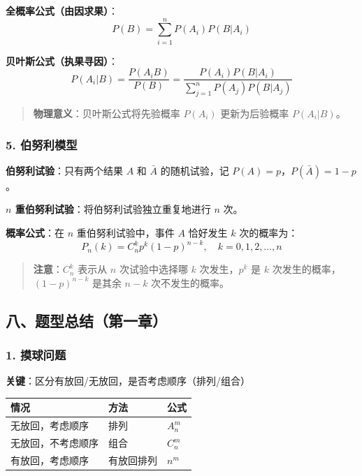 \documentclass[12pt,a4paper]{ctexart}
\newenvironment{myquote}
  {\par\vspace{0.5em}\begin{quote}\sffamily\color{gray}}
  {\end{quote}\vspace{0.5em}}
\begin{document}
\textbf{全概率公式（由因求果）}：
\[
    P(B) = \sum_{i=1}^n P(A_i) P(B|A_i)
\]

\textbf{贝叶斯公式（执果寻因）}：
\[
    P(A_i|B) = \frac{P(A_i B)}{P(B)} = \frac{P(A_i) P(B|A_i)}{\sum_{j=1}^n P(A_j) P(B|A_j)}
\]

\begin{myquote}
    \textbf{物理意义}：贝叶斯公式将先验概率 $P(A_i)$ 更新为后验概率 $P(A_i|B)$。
\end{myquote}

\subsubsection{5. 伯努利模型}
\textbf{伯努利试验}：只有两个结果 $A$ 和 $\bar{A}$ 的随机试验，记 $P(A) = p$，$P(\bar{A}) = 1-p$。

\textbf{$n$ 重伯努利试验}：将伯努利试验独立重复地进行 $n$ 次。

\textbf{概率公式}：在 $n$ 重伯努利试验中，事件 $A$ 恰好发生 $k$ 次的概率为：
\[
    P_n(k) = C_n^k p^k (1-p)^{n-k}, \quad k = 0,1,2,\dots,n
\]

\begin{myquote}
    \textbf{注意}：$C_n^k$ 表示从 $n$ 次试验中选择哪 $k$ 次发生，$p^k$ 是 $k$ 次发生的概率，$(1-p)^{n-k}$ 是其余 $n-k$ 次不发生的概率。
\end{myquote}

\subsection{八、题型总结（第一章）}

\subsubsection{1. 摸球问题}
\textbf{关键}：区分有放回/无放回，是否考虑顺序（排列/组合）

\begin{center}
    \begin{tabular}{@{}lll@{}}
        \toprule
        \textbf{情况} & \textbf{方法} & \textbf{公式} \\
        \midrule
        无放回，考虑顺序    & 排列          & $A_n^m$     \\
        无放回，不考虑顺序   & 组合          & $C_n^m$     \\
        有放回，考虑顺序    & 有放回排列       & $n^m$       \\
        \bottomrule
    \end{tabular}
\end{center}
\end{document}
